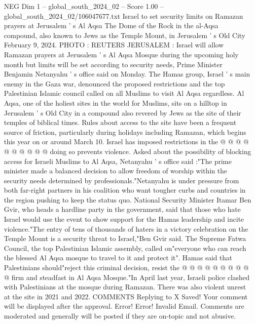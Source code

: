 \begin{textsample}{NEG Dim 1 – global\_south\_2024\_02 – Score 1.00 – global\_south\_2024\_02/106047677.txt}  \label{ex:f1_neg_421}
Israel to set security limits on Ramazan prayers at Jerusalem ' s Al Aqsa The Dome of the Rock in the al-Aqsa compound, also known to Jews as the Temple Mount, in Jerusalem ' s Old City February 9, 2024.
PHOTO : REUTERS JERUSALEM : Israel will allow Ramazan prayers at Jerusalem ' s Al Aqsa Mosque during the upcoming holy month but limits will be set according to security needs, Prime Minister Benjamin Netanyahu ' s office said on Monday.
The Hamas group, Israel ' s main enemy in the Gaza war, denounced the proposed restrictions and the top Palestinian Islamic council called on all Muslims to visit Al Aqsa regardless.
Al Aqsa, one of the holiest sites in the world for Muslims, sits on a hilltop in Jerusalem ' s Old City in a compound also revered by Jews as the site of their temples of biblical times.
Rules about access to the site have been a frequent source of friction, particularly during holidays including Ramazan, which begins this year on or around March 10.
Israel has imposed restrictions in the @ @ @ @ @ @ @ @ @ @ doing so prevents violence.
Asked about the possibility of blocking access for Israeli Muslims to Al Aqsa, Netanyahu ' s office said :"The prime minister made a balanced decision to allow freedom of worship within the security needs determined by professionals."Netanyahu is under pressure from both far-right partners in his coalition who want tougher curbs and countries in the region pushing to keep the status quo.
National Security Minister Itamar Ben Gvir, who heads a hardline party in the government, said that those who hate Israel would use the event to show support for the Hamas leadership and incite violence."The entry of tens of thousands of haters in a victory celebration on the Temple Mount is a security threat to Israel,"Ben Gvir said.
The Supreme Fatwa Council, the top Palestinian Islamic assembly, called on"everyone who can reach the blessed Al Aqsa mosque to travel to it and protect it".
Hamas said that Palestinians should"reject this criminal decision, resist the @ @ @ @ @ @ @ @ @ @ firm and steadfast in Al Aqsa Mosque."In April last year, Israeli police clashed with Palestinians at the mosque during Ramazan.
There was also violent unrest at the site in 2021 and 2022.
COMMENTS Replying to X Saved!
Your comment will be displayed after the approval.
Error!
Error!
Invalid Email.
Comments are moderated and generally will be posted if they are on-topic and not abusive.

\end{textsample}
